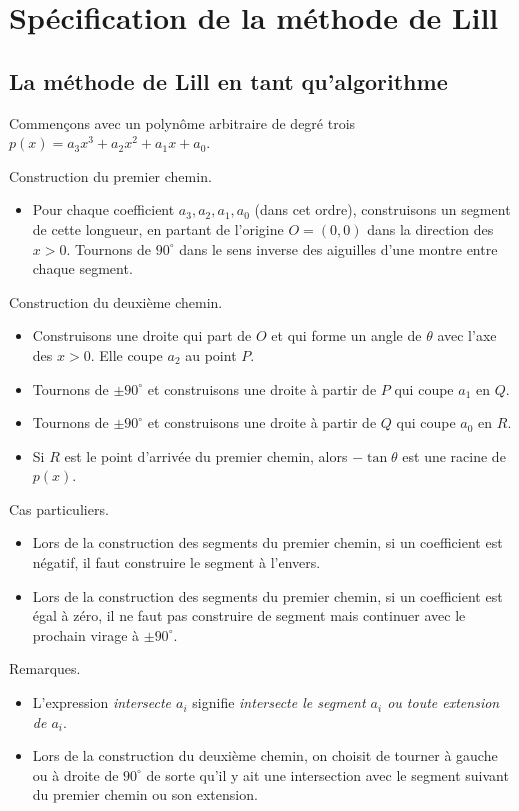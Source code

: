 \section{Spécification de la méthode de Lill}\label{s.method}

\subsection{La méthode de Lill en tant qu'algorithme}


Commençons avec un polynôme 
 arbitraire  de degré trois $p(x)=a_3x^3+a_2x^2+a_1x+a_0$.

 Construction du premier chemin.
\begin{itemize}
\item Pour chaque coefficient $a_3,a_2,a_1,a_0$ (dans cet ordre), construisons un segment  de cette longueur, en partant de l'origine $O=(0,0)$ dans la direction des $x>0$. Tournons de  $90^\circ$ dans le sens inverse des aiguilles d'une montre entre chaque segment.
\end{itemize}
 Construction du deuxième chemin.
\begin{itemize}
\item Construisons une droite qui part de $O$ et qui forme un angle de $\theta$ avec l'axe des $x>0$. Elle  coupe $a_2$ au point $P$.
\item Tournons de $\pm 90^\circ$ et construisons une droite à partir de $P$ qui coupe $a_1$ en $Q$.
\item Tournons de $\pm 90^\circ$ et construisons une droite à partir de $Q$ qui coupe $a_0$ en $R$.
\item Si $R$ est le point d'arrivée du premier chemin, alors $-\tan\theta$ est une racine de $p(x)$.
\end{itemize}
 Cas particuliers.
\begin{itemize}
\item Lors de la construction des segments du premier chemin, si un coefficient est négatif, il faut construire le segment à l'envers.
\item Lors de la construction des segments du premier chemin, si un coefficient est égal à zéro, il ne faut pas construire de segment  mais continuer avec le prochain virage à $\pm 90^\circ$.
\end{itemize}
 Remarques.
\begin{itemize}
\item L'expression \emph{intersecte  $a_i$} signifie \emph{intersecte le segment  $a_i$ ou toute extension de $a_i$}.
\item Lors de la construction du deuxième chemin, on choisit de tourner à gauche ou à droite de $90^\circ$ de sorte qu'il y ait une intersection avec le segment suivant du premier chemin ou son extension.
\end{itemize}


